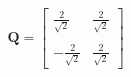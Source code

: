 \documentclass[preview]{standalone}
\begin{document}
\begin{align*}
\mathbf{Q} = \begin{bmatrix} \frac{2}{\sqrt{2}} & \frac{2}{\sqrt{2}} \\ \\-\frac{2}{\sqrt{2}} &  \frac{2}{\sqrt{2}} \end{bmatrix}
\end{align*}
\end{document}
